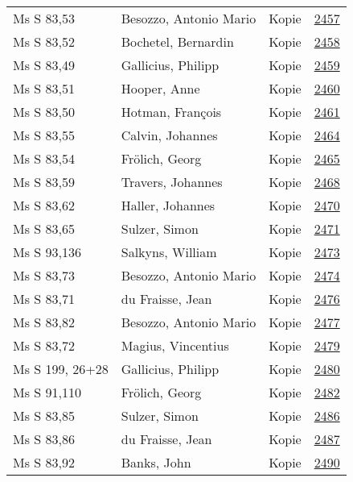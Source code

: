 \documentclass[10pt,a4paper,landscape]{report}
\begin{document}
\begin{longtable}{p{16cm}p{4cm}lr}
Ms S 83,53	&	Besozzo, Antonio Mario	&	Kopie	&	\href{http://130.60.24.72/assignment/2457}{2457}\\
Ms S 83,52	&	Bochetel, Bernardin	&	Kopie	&	\href{http://130.60.24.72/assignment/2458}{2458}\\
Ms S 83,49	&	Gallicius, Philipp	&	Kopie	&	\href{http://130.60.24.72/assignment/2459}{2459}\\
Ms S 83,51	&	Hooper, Anne	&	Kopie	&	\href{http://130.60.24.72/assignment/2460}{2460}\\
Ms S 83,50	&	Hotman, François	&	Kopie	&	\href{http://130.60.24.72/assignment/2461}{2461}\\
Ms S 83,55	&	Calvin, Johannes	&	Kopie	&	\href{http://130.60.24.72/assignment/2464}{2464}\\
Ms S 83,54	&	Frölich, Georg	&	Kopie	&	\href{http://130.60.24.72/assignment/2465}{2465}\\
Ms S 83,59	&	Travers, Johannes	&	Kopie	&	\href{http://130.60.24.72/assignment/2468}{2468}\\
Ms S 83,62	&	Haller, Johannes	&	Kopie	&	\href{http://130.60.24.72/assignment/2470}{2470}\\
Ms S 83,65	&	Sulzer, Simon	&	Kopie	&	\href{http://130.60.24.72/assignment/2471}{2471}\\
Ms S 93,136	&	Salkyns, William	&	Kopie	&	\href{http://130.60.24.72/assignment/2473}{2473}\\
Ms S 83,73	&	Besozzo, Antonio Mario	&	Kopie	&	\href{http://130.60.24.72/assignment/2474}{2474}\\
Ms S 83,71	&	du Fraisse, Jean	&	Kopie	&	\href{http://130.60.24.72/assignment/2476}{2476}\\
Ms S 83,82	&	Besozzo, Antonio Mario	&	Kopie	&	\href{http://130.60.24.72/assignment/2477}{2477}\\
Ms S 83,72	&	Magius, Vincentius	&	Kopie	&	\href{http://130.60.24.72/assignment/2479}{2479}\\
Ms S 199, 26+28	&	Gallicius, Philipp	&	Kopie	&	\href{http://130.60.24.72/assignment/2480}{2480}\\
Ms S 91,110	&	Frölich, Georg	&	Kopie	&	\href{http://130.60.24.72/assignment/2482}{2482}\\
Ms S 83,85	&	Sulzer, Simon	&	Kopie	&	\href{http://130.60.24.72/assignment/2486}{2486}\\
Ms S 83,86	&	du Fraisse, Jean	&	Kopie	&	\href{http://130.60.24.72/assignment/2487}{2487}\\
Ms S 83,92	&	Banks, John	&	Kopie	&	\href{http://130.60.24.72/assignment/2490}{2490}\\

\end{longtable}
\end{document}
